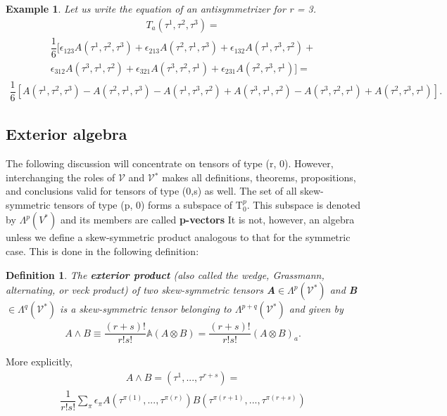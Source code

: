 \documentclass[12pt,a4paper]{article}
\newtheorem{defn}[thm]{Definition}
\newtheorem{exmp}{Example}[section]
\begin{document}
\begin{exmp}
Let us write the equation of an antisymmetrizer for r = 3.\\
\begin{align*}
T_a(\tau^1,\tau^2,\tau^3) =
\end{align*}
\begin{align*}
 \dfrac{1}{6} [ \epsilon_{123}A(\tau^1,\tau^2,\tau^3) + \epsilon_{213}A(\tau^2,\tau^1,\tau^3) + \epsilon_{132}A(\tau^1,\tau^3,\tau^2) +\\ \epsilon_{312}A(\tau^3,\tau^1,\tau^2) + \epsilon_{321}A(\tau^3,\tau^2,\tau^1) + \epsilon_{231}A(\tau^2,\tau^3,\tau^1) ] =
 \end{align*}
 \begin{align*}
\dfrac{1}{6} [A(\tau^1,\tau^2,\tau^3)- A(\tau^2,\tau^1,\tau^3)  - A(\tau^1,\tau^3,\tau^2) + A(\tau^3,\tau^1,\tau^2) - A(\tau^3,\tau^2,\tau^1) + A(\tau^2,\tau^3,\tau^1) ].
\end{align*}

\end{exmp}

\subsection{Exterior algebra}
The following discussion will concentrate on tensors of type (r, 0). However, interchanging the roles of $\mathcal{V}$ and $\mathcal{V}$$^*$ makes all definitions, theorems,
propositions, and conclusions valid for tensors of type (0,s) as well. The set of all skew-symmetric tensors of type (p, 0) forms a subspace of T$^{p}_{0}$. This subspace is denoted by $\Lambda^{p}  (V^*)$ and its members are called \textbf{p-vectors} It is not, however, an algebra unless we define a skew-symmetric
product analogous to that for the symmetric case. This is done in the following definition:
\begin{defn}
The \textbf{exterior product} (also called the wedge, Grassmann, alternating, or veck product) of two skew-symmetric tensors \textbf{A}$\in\Lambda^{p}(\mathcal{V}^*)$ and  \textbf{B}$\in\Lambda^{q}(\mathcal{V}^*)$ is a skew-symmetric tensor belonging to $\Lambda^{p+q}(\mathcal{V}^*)$ and given by
\begin{align*}
A \wedge B \equiv \dfrac{(r+s)!}{r!s!} \mathbb{A} (A \otimes B ) =\dfrac{(r+s)!}{r!s!}(A \otimes B ) _{a}.
\end{align*}
\end{defn}

More explicitly,\\
\begin{align*}
A \wedge B = (\tau^1,...,\tau^{r+s})=
\end{align*}
\begin{align*}	
\dfrac{1}{r!s!}\sum_{\pi}\epsilon_{\pi} A (\tau^{\pi(1)},...,\tau^{\pi(r)})B (\tau^{\pi(r+1)},...,\tau^{\pi(r+s)})
\end{align*}
\end{document}
